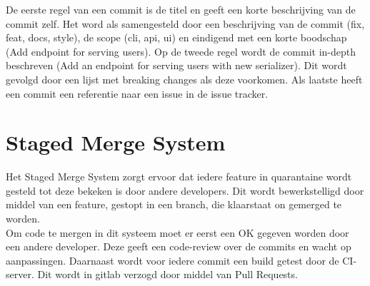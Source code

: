 De eerste regel van een commit is de titel en geeft een korte beschrijving van de commit zelf. Het word als samengesteld door een beschrijving van de commit (fix, feat, docs, style), de scope (cli, api, ui) en eindigend met een korte boodschap (Add endpoint for serving users). Op de tweede regel wordt de commit in-depth beschreven (Add an endpoint for serving users with new serializer). Dit wordt gevolgd door een lijst met breaking changes als deze voorkomen. Als laatste heeft een commit een referentie naar een issue in de issue tracker.

\section{Staged Merge System}

Het Staged Merge System zorgt ervoor dat iedere feature in quarantaine wordt gesteld tot deze bekeken is door andere developers. Dit wordt bewerkstelligd door middel van een feature, gestopt in een branch, die klaarstaat on gemerged te worden. \\

Om code te mergen in dit systeem moet er eerst een OK gegeven worden door een andere developer. Deze geeft een code-review over de commits en wacht op aanpassingen. Daarnaast wordt voor iedere commit een build getest door de CI-server. Dit wordt in gitlab verzogd door middel van Pull Requests. \\	